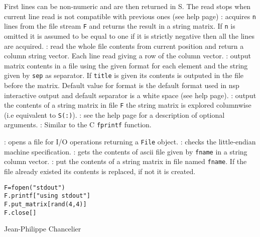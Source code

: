 \begin{itemize}
  First lines can be non-numeric and are then returned in S. The read stops when current 
  line read is not compatible with previous ones (see   help page)
  : acquires \verb+n+ lines from the file stream \verb+F+ and returns 
  the result in a string matrix. If \verb+n+ is omitted it is assumed to be equal to 
  one if it is strictly negative then all the lines are acquired.
  : read the whole file contents from current position
  and return a column string vector. Each line read giving a row of the column vector.
  : 
    output  matrix contents in a file using the given format for each element 
    and the string given by \verb+sep+ as separator. If \verb+title+ is given 
    its contents is outputed in the file before the matrix. Default value 
    for format is the default format used in nsp interactive output and default 
    separator is a white space (see   help page).  
  : output the contents of a string matrix in file \verb+F+ 
  the string matrix is explored columnwise (i.e equivalent to \verb+S(:)+).
  : 
  see the  help page for a description of optional arguments.
  : Similar to the C \verb+fprintf+ function. 
\end{itemize}

\begin{itemize}
  : opens a file for I/O operations returning a \verb+File+ object.
  : checks the little-endian machine specification.
  : gets the contents of ascii file given by \verb+fname+ 
  in a string column vector.
  : put the contents of a string matrix in file named 
  \verb+fname+. If the file already existed its contents is replaced, if not it is 
  created. 
\end{itemize}

\begin{examples}
\begin{Verbatim}
F=fopen("stdout")
F.printf["using stdout"]
F.put_matrix[rand(4,4)]
F.close[]
\end{Verbatim}
\end{examples}

\begin{manseealso}
\end{manseealso}

\begin{authors}
  Jean-Philippe Chancelier 
\end{authors}

